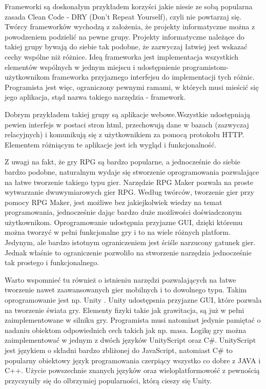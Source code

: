 \documentclass{xmgr}
\begin{document}
Frameworki są doskonałym przykładem korzyści jakie niesie ze sobą popularna zasada Clean Code \cite{CleanCode:2005} - DRY (Don't Repeat Yourself), czyli nie powtarzaj się. 
Twórcy frameworków  wychodzą z założenia, że projekty informatyczne można z powodzeniem podzielić na pewne grupy. Projekty informatyczne należące do takiej grupy bywają do siebie tak podobne, że zazwyczaj łatwiej jest wskazać cechy wspólne niż różnice. Ideą frameworka jest implementacja wszystkich elementów wspólnych w jednym miejscu i udostępnienie programistom-użytkownikom frameworka przyjaznego interfejsu do implementacji tych różnic. Programista jest więc, ograniczony pewnymi ramami, w których musi mieścić się jego aplikacja, stąd nazwa takiego narzędzia - framework.

Dobrym przykładem takiej grupy są aplikacje webowe.Wszystkie udostępniają pewien interfejs w postaci stron html, przechowują dane w bazach (zazwyczaj relacyjnych) i komunikują się z użytkownikiem za pomocą protokołu HTTP. Elementem różniącym te aplikacje jest ich wygląd i funkcjonalność. 

Z uwagi na fakt, że gry RPG są bardzo popularne, a jednocześnie do siebie bardzo podobne, naturalnym wydaje się stworzenie oprogramowania pozwalające na łatwe tworzenie takiego typu gier. Narzędzie RPG Maker \cite{RPGMaker:2017:Doc} pozwala na proste wytwarzanie dwuwymiarowych gier RPG. Według twórców, tworzenie gier przy pomocy RPG Maker, jest możliwe bez jakiejkolwiek wiedzy na temat programowania, jednocześnie dając bardzo duże możliwości doświadczonym użytkownikom. Oprogramowanie udostępnia przyjazne GUI, dzięki któremu można tworzyć w pełni funkcjonalne gry i to na wiele różnych platform. Jedynym, ale bardzo istotnym ograniczeniem jest ściśle narzucony gatunek gier. Jednak właśnie to ograniczenie pozwoliło na stworzenie narzędzia jednocześnie tak prostego i funkcjonalnego. 

Warto wspomnieć tu również o istnieniu narzędzi pozwalających na łatwe tworzenie nawet zaawansowanych gier mobilnych i to dowolnego typu. Takim oprogramowanie jest np. Unity \cite{Unity3D:2017:Doc}. Unity udostępsnia przyjazne GUI, które pozwala na tworzenie świata gry. Elementy fizyki takie jak grawitacja, są już w pełni zaimplementowane w silniku gry. Programista musi natomiast jedynie pamiętać o nadaniu obiektom odpowiednich cech takich jak np. masa. Logikę gry można zaimplementować w jednym z dwóch języków UnityScript oraz C\#. UnityScript jest językiem o składni bardzo zbliżonej do JavaScript, natomiast C\# to popularny obiektowy język programowania czerpiący wszystko co dobre z JAVA i C++. Użycie powszechnie znanych języków oraz wieloplatformowość z pewnością przyczyniły się do olbrzymiej popularności, którą cieszy się Unity.
\end{document}
